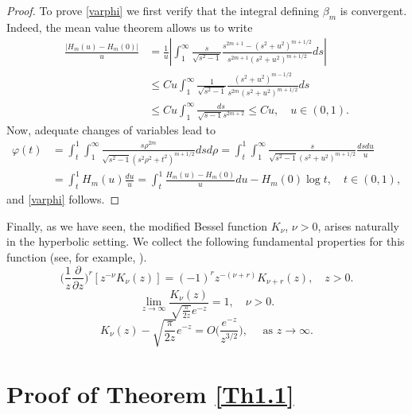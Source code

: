 \documentclass[a4paper,10pt, reqno]{amsart}
\theoremstyle{definition}
\theoremstyle{remark}
\numberwithin{equation}{section}
\begin{document}
{\begin{proof}
To prove \eqref{varphi} we first verify that the integral defining $\beta_m$ is convergent. Indeed, the mean value theorem allows us to write  
\begin{align*}
\frac{|H_m(u)-H_m(0)|}{u}&=\frac{1}{u}\left|\int_1^\infty \frac{s}{\sqrt{s^2-1}}\frac{s^{2m+1}-(s^2+u^2)^{m+1/2}}{s^{2m+1}(s^2+u^2)^{m+1/2}}ds\right|\\
&\leq Cu\int_1^\infty  \frac{1}{\sqrt{s^2-1}}\frac{(s^2+u^2)^{m-1/2}}{s^{2m}(s^2+u^2)^{m+1/2}}ds\\
&\leq Cu\int_1^\infty \frac{ds}{\sqrt{s-1}s^{2m+2}}\leq Cu,\quad u\in (0,1).
\end{align*}
Now, adequate changes of variables lead to
\begin{align*}
\varphi (t)&=\int_t^1\int_1 ^\infty \frac{s\rho ^{2m}}{\sqrt{s^2-1}(s^2\rho ^2+t^2)^{m+1/2}}dsd\rho=\int_t^1\int_1 ^\infty \frac{s}{\sqrt{s^2-1}(s^2+u^2)^{m+1/2}}\frac{dsdu}{u}\\
&=\int_t^1H_m(u)\frac{du}{u}=\int_t^1\frac{H_m(u)-H_m(0)}{u}du-H_m(0)\log t,\quad t\in (0,1),
\end{align*}
and \eqref{varphi} follows.
\end{proof}

Finally, as we have seen, the modified Bessel function $K_\nu $, $\nu >0$, arises naturally in the hyperbolic setting.  We collect the following fundamental properties for this function (see, for example,  \cite[Chapter 5]{Leb}).
\begin{equation}\label{Kderiv}
\Big(\frac{1}{z}\frac{\partial }{\partial z}\Big)^r[z^{-\nu }K_\nu (z)]=(-1)^rz^{-(\nu +r)}K_{\nu +r}(z),\quad z>0.
\end{equation}
\begin{equation}\label{cotaKinfty}
\lim_{z\rightarrow \infty }\frac{K_\nu (z)}{\sqrt{\frac{\pi}{2z}}e^{-z}}=1,\quad \nu>0.
\end{equation}
\begin{equation}\label{asintotico}
K_\nu (z)-\sqrt{\frac{\pi}{2z}}e^{-z}=O\Big(\frac{e^{-z}}{z^{3/2}}\Big),\quad \mbox{ as }z\rightarrow \infty.
\end{equation}

\section{Proof of Theorem \ref{Th1.1}}\label{S3}

}
\end{document}
